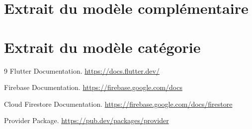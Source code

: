 \documentclass[12pt,a4paper]{report}
\begin{document}
\appendix
\chapter{Extrait du modèle complémentaire}



\chapter{Extrait du modèle catégorie}



\begin{thebibliography}{9}
Flutter Documentation.
\newblock \url{https://docs.flutter.dev/}

Firebase Documentation.
\newblock \url{https://firebase.google.com/docs}

Cloud Firestore Documentation.
\newblock \url{https://firebase.google.com/docs/firestore}

Provider Package.
\newblock \url{https://pub.dev/packages/provider}
\end{thebibliography}
\end{document}
